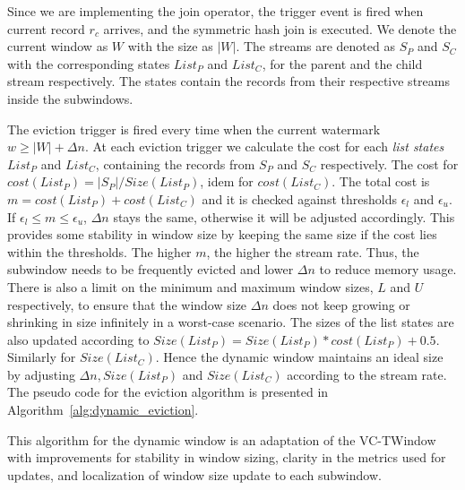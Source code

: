 Since we are implementing the join operator, the trigger event is fired when current record 
$r_c$ arrives, and the symmetric hash join is executed. We denote the current window as 
$W$ with the size as $|W|$. The streams are denoted as $S_P$ and $S_C$ with 
the corresponding states $List_P$ and $List_C$, for the parent and 
the child stream respectively. The states contain the records from their 
respective streams inside the subwindows.

The eviction trigger is fired every time when the current watermark 
$w \ge |W| + \Delta n$. At each eviction trigger we calculate
the cost for each \emph{list states} $List_P$ and $List_C$, containing the records from $S_P$ and $S_C$
respectively. The cost for $cost(List_P) = |S_P|/Size(List_P)$, idem for $cost(List_C)$. 
The total cost is $m = cost(List_P) + cost(List_C)$ and it is checked against thresholds $\epsilon_l$ and $\epsilon_u$. If  $\epsilon_l \le m \le \epsilon_u$, 
$\Delta n$ stays the same, otherwise it will be adjusted accordingly. This provides some stability 
in window size by keeping the same size if the cost lies within the thresholds. 
The higher $m$, the higher the stream rate. Thus, the subwindow needs to be frequently 
evicted and lower $\Delta n$ to reduce memory usage. There is also a limit on the 
minimum and maximum window sizes, $L$ and $U$ respectively, to ensure that the window 
size $\Delta n$ does not keep growing or shrinking in size infinitely in a worst-case scenario. 
The sizes of the list states 
are also updated according to $Size(List_P) = Size(List_P) * cost(List_P) + 0.5$.
Similarly for $Size(List_C)$. 
Hence the dynamic window maintains an 
ideal size by adjusting $\Delta n, Size(List_P)$ and $Size(List_C)$ according to 
the stream rate. The pseudo code for the eviction algorithm is presented in Algorithm~\ref{alg:dynamic_eviction}.

This algorithm for the dynamic window is an adaptation of the VC-TWindow~\cite{vctw_join} with 
improvements for stability in window sizing, clarity in the metrics used for updates, and localization 
of window size update to each subwindow.  

